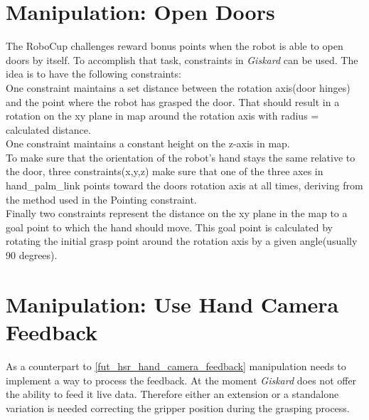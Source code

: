 \documentclass[main.tex]{subfiles}
\begin{document}
		\section{Manipulation: Open Doors}
		The RoboCup challenges reward bonus points when the robot is able to open doors by itself. To accomplish that task, constraints in \textit{Giskard} can be used. The idea is to have the following constraints:\\
		One constraint maintains a set distance between the rotation axis(door hinges) and the point where the robot has grasped the door. That should result in a rotation on the xy plane in map around the rotation axis with radius = calculated distance.\\
		One constraint maintains a constant height on the z-axis in map.\\
		To make sure that the orientation of the robot's hand stays the same relative to the door, three constraints(x,y,z) make sure that one of the three axes in hand\_palm\_link points toward the doors rotation axis at all times, deriving from the method used in the Pointing constraint.\\
		Finally two constraints represent the distance on the xy plane in the map to a goal point to which the hand should move. This goal point is calculated by rotating the initial grasp point around the rotation axis by a given angle(usually 90 degrees).
		
		\section{Manipulation: Use Hand Camera Feedback}
		As a counterpart to \ref{fut_hsr_hand_camera_feedback} manipulation needs to implement a way to process the feedback. At the moment \textit{Giskard} does not offer the ability to feed it live data. Therefore either an extension or a standalone variation is needed correcting the gripper position during the grasping process.
				
		
		
	\endgroup
\end{document}
